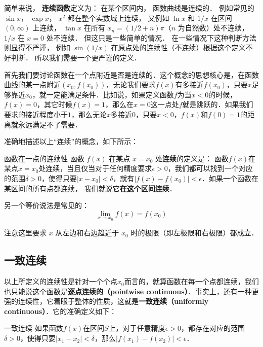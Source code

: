 

简单来说， \textbf{连续函数}定义为： 在某个区间内， 函数曲线是连续的． 例如常见的 $\sin x$， $\exp x$， $x^2$ 都在整个实数域上连续， 又例如 $\ln x$ 和 $1/x$ 在区间 $(0, \infty)$ 上连续， $\tan x$ 在所有 $x_n = (1/2 + n)\pi$（$n$ 为自然数）处不连续， $1/x$ 在 $x = 0$ 处不连续． 但这只是一些简单的情况． 在一些情况下这种判断方法则显得不严谨， 例如 $\sin(1/x)$ 在原点处的连续性（不连续）根据这个定义不好判断． 所以我们需要一个更严谨的定义．

首先我们要讨论函数在一个点附近是否是连续的．这个概念的思想核心是，在函数曲线的某一点附近$(x_0, f(x_0))$，无论我们要求$f(x)$有多接近$f(x_0)$，只要$x$足够靠近$x_0$，就一定能满足条件．比如说，如果定义函数$f$为当$x<0$的时候，$f(x)=0$，其它时候$f(x)=1$，那么在$x=0$这一点处$f$就是跳跃的．如果我们要求的接近程度小于$1$，那么无论$x$多接近$0$，只要$x<0$，$f(x)$和$f(0)=1$的距离就永远满足不了需要．

准确地描述以上“连续”的概念，如下所示：

\begin{definition}{函数在一点的连续性}
函数 $f(x)$ 在某点 $x = x_0$ 处\textbf{连续}的定义是： 函数$f(x)$在某点$x=x_0$处连续，当且仅当对于任何精度要求$\epsilon>0$，我们都可以找到一个对应的范围$\delta>0$，使得只要$|x-x_0|<\delta$，就有$|f(x)-f(x_0)|<\epsilon$．如果一个函数在某区间的所有点都连续， 我们就说它\textbf{在这个区间连续}．

另一个等价说法是常见的：
\begin{equation}
\lim_{x \to x_0} f(x) = f(x_0)
\end{equation}
\end{definition}

注意这里要求 $x$ 从左边和右边趋近于 $x_0$ 时的极限（即左极限和右极限）都成立． %

\subsection{一致连续}

以上所定义的连续性是针对一个个点$x_0$而言的，就算函数在每一个点都连续，我们也只能说这个函数是\textbf{逐点连续的（pointwise continuous）}．事实上，还有一种更强的连续性，它着眼于整体的性质，这就是\textbf{一致连续（uniformly continuous）}．它的准确定义如下：

\begin{definition}{一致连续}
如果函数$f(x)$在区间$S$上，对于任意精度$\epsilon>0$，都存在对应的范围$\delta>0$，使得只要$|x_1-x_2|<\delta$，那么$|f(x_1)-f(x_2)|<\epsilon$．

\end{definition}

